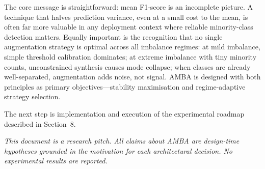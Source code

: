 \documentclass[11pt,a4paper]{article}
\begin{document}
The core message is straightforward: mean F1-score is an incomplete picture. A technique
that halves prediction variance, even at a small cost to the mean, is often far more valuable
in any deployment context where reliable minority-class detection matters. Equally important
is the recognition that no single augmentation strategy is optimal across all imbalance
regimes: at mild imbalance, simple threshold calibration dominates; at extreme imbalance
with tiny minority counts, unconstrained synthesis causes mode collapse; when classes are
already well-separated, augmentation adds noise, not signal. AMBA is designed with both
principles as primary objectives---stability maximisation and regime-adaptive strategy
selection.

The next step is implementation and execution of the experimental roadmap described in
Section~8.

\vspace{1em}
\noindent\textit{This document is a research pitch. All claims about AMBA are
design-time hypotheses grounded in the motivation for each architectural decision.
No experimental results are reported.}
\end{document}
